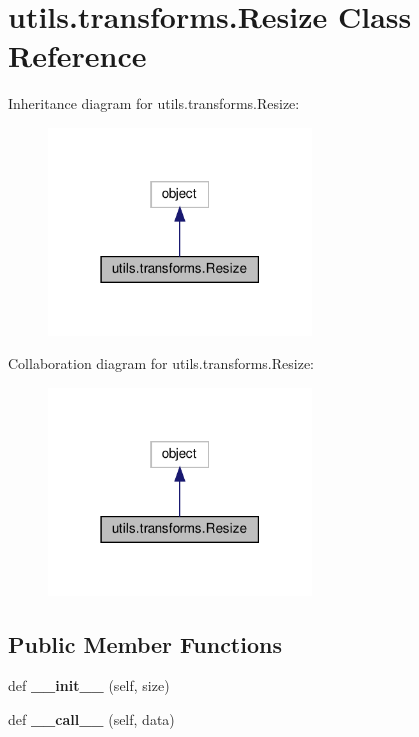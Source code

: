 \hypertarget{classutils_1_1transforms_1_1Resize}{}\section{utils.\+transforms.\+Resize Class Reference}
\label{classutils_1_1transforms_1_1Resize}


Inheritance diagram for utils.\+transforms.\+Resize\+:
\nopagebreak
\begin{figure}[H]
\begin{center}
\leavevmode
\includegraphics[width=198pt]{classutils_1_1transforms_1_1Resize__inherit__graph}
\end{center}
\end{figure}


Collaboration diagram for utils.\+transforms.\+Resize\+:
\nopagebreak
\begin{figure}[H]
\begin{center}
\leavevmode
\includegraphics[width=198pt]{classutils_1_1transforms_1_1Resize__coll__graph}
\end{center}
\end{figure}
\subsection*{Public Member Functions}
\begin{DoxyCompactItemize}
\item 
\mbox{\label{classutils_1_1transforms_1_1Resize_afba5041a07fd7b0f8ca5c4bde67e2908}} 
def {\bfseries \+\_\+\+\_\+init\+\_\+\+\_\+} (self, size)
\item 
\mbox{\label{classutils_1_1transforms_1_1Resize_aad678331422946a274c53ee435586a0f}} 
def {\bfseries \+\_\+\+\_\+call\+\_\+\+\_\+} (self, data)
\end{DoxyCompactItemize}
